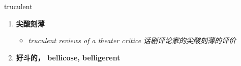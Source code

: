 
\begin{frame}
{\huge truculent}
\begin{center}
\begin{enumerate}\Large
  \item \textbf{尖酸刻薄}
  \begin{itemize}
    \item \em{\Large{truculent reviews of a theater critice 话剧评论家的尖酸刻薄的评价}}
  \end{itemize}
  \item \textbf{好斗的， bellicose, belligerent}
\end{enumerate}
\end{center}
\end{frame}

